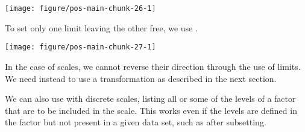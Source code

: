 \documentclass[krantz2]{krantz}\usepackage{knitr}%
\begin{document}
\begin{knitrout}\footnotesize
{}\color{fgcolor}\begin{kframe}
\begin{alltt}
  \hlopt{+} \hlstd{()} \hlopt{+}
  \hlstd{(} \hlstd{=} \hlstd{(}\hlstd{,} \hlstd{))}
\end{alltt}


{\ttfamily\noindent\color{warningcolor}{\#\# Warning: Removed 36 rows containing missing values (geom\_point).}}\end{kframe}

{\centering \texttt{[image: figure/pos-main-chunk-26-1]} 

}



\end{knitrout}

To set only one limit leaving the other free, we use .

\begin{knitrout}\footnotesize
{}\color{fgcolor}\begin{kframe}
\begin{alltt}
  \hlopt{+} \hlstd{()} \hlopt{+}
  \hlstd{(} \hlstd{=} \hlstd{(}\hlstd{,} \hlstd{))}
\end{alltt}


{\ttfamily\noindent\color{warningcolor}{\#\# Warning: Removed 36 rows containing missing values (geom\_point).}}\end{kframe}

{\centering \texttt{[image: figure/pos-main-chunk-27-1]} 

}



\end{knitrout}

In the case of scales, we cannot reverse their direction through the use of limits. We need instead to use a transformation as described in the next section.

We can also use  with discrete scales, listing all or some of the levels of a factor that are to be included in the scale. This works even if the levels are defined in the factor but not present in a given data set, such as after subsetting.
\end{document}

